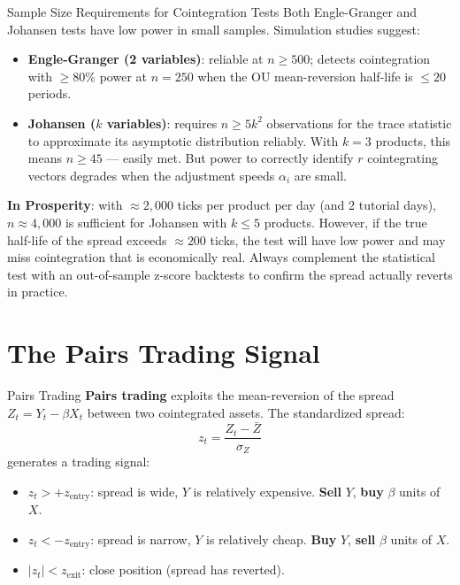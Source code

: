 \documentclass[12pt,a4paper,openany]{report}
\theoremstyle{definition}
\begin{document}
\begin{warningbox}{Sample Size Requirements for Cointegration Tests}
Both Engle-Granger and Johansen tests have low power in small samples. Simulation studies suggest:
\begin{itemize}
  \item \textbf{Engle-Granger (2 variables)}: reliable at $n \geq 500$; detects cointegration with $\geq 80\%$ power at $n = 250$ when the OU mean-reversion half-life is $\leq 20$ periods.
  \item \textbf{Johansen ($k$ variables)}: requires $n \geq 5k^2$ observations for the trace statistic to approximate its asymptotic distribution reliably. With $k = 3$ products, this means $n \geq 45$ — easily met. But power to correctly identify $r$ cointegrating vectors degrades when the adjustment speeds $\alpha_i$ are small.
\end{itemize}
\textbf{In Prosperity}: with $\approx 2{,}000$ ticks per product per day (and 2 tutorial days), $n \approx 4{,}000$ is sufficient for Johansen with $k \leq 5$ products. However, if the true half-life of the spread exceeds $\approx 200$ ticks, the test will have low power and may miss cointegration that is economically real. Always complement the statistical test with an out-of-sample z-score backtests to confirm the spread actually reverts in practice.
\end{warningbox}

\section{The Pairs Trading Signal}

\begin{definitionbox}{Pairs Trading}
\textbf{Pairs trading} exploits the mean-reversion of the spread $Z_t = Y_t - \beta X_t$ between two cointegrated assets. The standardized spread:
\[
  z_t = \frac{Z_t - \bar{Z}}{\sigma_Z}
\]
generates a trading signal:
\begin{itemize}
  \item $z_t > +z_{\text{entry}}$: spread is wide, $Y$ is relatively expensive. \textbf{Sell} $Y$, \textbf{buy} $\beta$ units of $X$.
  \item $z_t < -z_{\text{entry}}$: spread is narrow, $Y$ is relatively cheap. \textbf{Buy} $Y$, \textbf{sell} $\beta$ units of $X$.
  \item $|z_t| < z_{\text{exit}}$: close position (spread has reverted).
\end{itemize}
\end{definitionbox}
\end{document}
